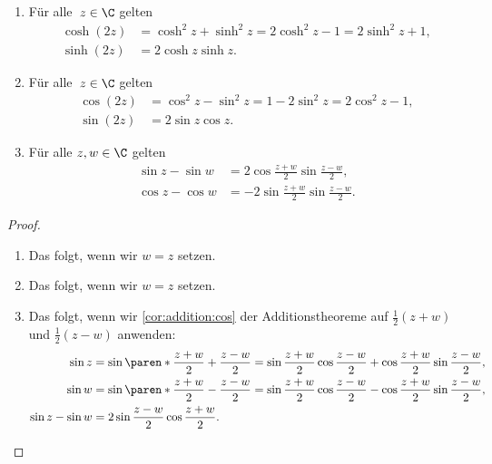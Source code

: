 \documentclass[a4paper]{article}
\begin{document}
\begin{corollary}[Doopelwinkelfunktionen]\leavevmode
    \begin{enumerate}
        \item Für alle~$z \in \C$ gelten
              \begin{align*}
                  \cosh(2z) & = \cosh^2z + \sinh^2z = 2\cosh^2z - 1 = 2\sinh^2z + 1, \\
                  \sinh(2z) & = 2\cosh z\sinh z.
              \end{align*}
        \item Für alle~$z \in \C$ gelten
              \begin{align*}
                  \cos(2z) & = \cos^2z - \sin^2z = 1 - 2\sin^2z = 2\cos^2z - 1, \\
                  \sin(2z) & = 2\sin z\cos z.
              \end{align*}
        \item Für alle $z,w \in \C$ gelten
              \begin{align*}
                  \sin z - \sin w & = 2 \cos\frac{z+w}{2} \sin\frac{z-w}{2},  \\
                  \cos z - \cos w & = -2 \sin\frac{z+w}{2} \sin\frac{z-w}{2}.
              \end{align*}
    \end{enumerate}
\end{corollary}

\begin{proof}\leavevmode
    \begin{enumerate}
        \item Das folgt, wenn wir $w = z$ setzen.
        \item Das folgt, wenn wir $w = z$ setzen.
        \item Das folgt, wenn wir \cref{cor:addition:cos} der Additionstheoreme auf $\frac{1}{2}(z+w)$ und $\frac{1}{2}(z-w)$ anwenden:
              \begin{align*}
                  \sin z          & = \sin\paren*{\frac{z+w}{2}+\frac{z-w}{2}} = \sin\frac{z+w}{2}\cos\frac{z-w}{2} + \cos\frac{z+w}{2}\sin\frac{z-w}{2}, \\
                  \sin w          & = \sin\paren*{\frac{z+w}{2}-\frac{z-w}{2}} = \sin\frac{z+w}{2}\cos\frac{z-w}{2} - \cos\frac{z+w}{2}\sin\frac{z-w}{2}, \\
                  \sin z - \sin w & = 2 \sin\frac{z-w}{2} \cos\frac{z+w}{2}. \qedhere
              \end{align*}
    \end{enumerate}
\end{proof}
\end{document}
